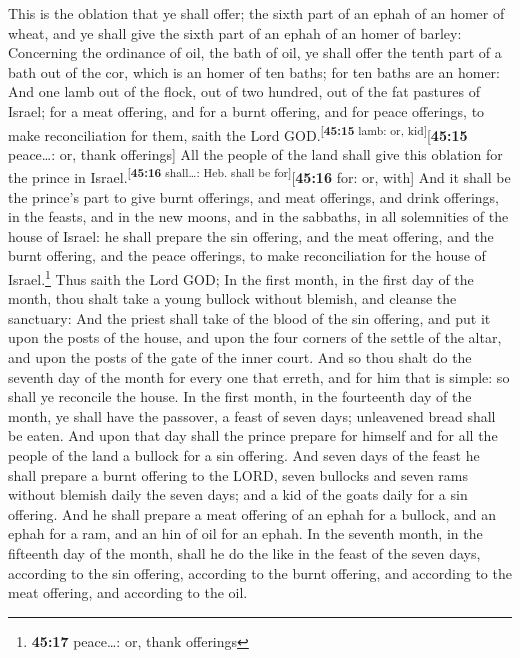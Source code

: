  This is the oblation that ye shall offer; the sixth part
of an ephah of an homer of wheat, and ye shall give the sixth part of an
ephah of an homer of barley:  Concerning the ordinance of
oil, the bath of oil, ye shall offer the tenth part of a bath out of the
cor, which is an homer of ten baths; for ten baths are an homer:
 And one lamb out of the flock, out of two hundred, out
of the fat pastures of Israel; for a meat offering, and for a burnt
offering, and for peace offerings, to make reconciliation for them,
saith the Lord GOD.\textsuperscript{{[}\textbf{45:15} lamb: or,
kid{]}}{[}\textbf{45:15} peace\ldots: or, thank offerings{]}
 All the people of the land shall give this oblation for
the prince in Israel.\textsuperscript{{[}\textbf{45:16} shall\ldots:
Heb. shall be for{]}}{[}\textbf{45:16} for: or, with{]} 
And it shall be the prince's part to give burnt offerings, and meat
offerings, and drink offerings, in the feasts, and in the new moons, and
in the sabbaths, in all solemnities of the house of Israel: he shall
prepare the sin offering, and the meat offering, and the burnt offering,
and the peace offerings, to make reconciliation for the house of
Israel.\footnote{\textbf{45:17} peace\ldots: or, thank offerings}
 Thus saith the Lord GOD; In the first month, in the
first day of the month, thou shalt take a young bullock without blemish,
and cleanse the sanctuary:  And the priest shall take of
the blood of the sin offering, and put it upon the posts of the house,
and upon the four corners of the settle of the altar, and upon the posts
of the gate of the inner court.  And so thou shalt do the
seventh day of the month for every one that erreth, and for him that is
simple: so shall ye reconcile the house.  In the first
month, in the fourteenth day of the month, ye shall have the passover, a
feast of seven days; unleavened bread shall be eaten. 
And upon that day shall the prince prepare for himself and for all the
people of the land a bullock for a sin offering.  And
seven days of the feast he shall prepare a burnt offering to the LORD,
seven bullocks and seven rams without blemish daily the seven days; and
a kid of the goats daily for a sin offering.  And he
shall prepare a meat offering of an ephah for a bullock, and an ephah
for a ram, and an hin of oil for an ephah.  In the
seventh month, in the fifteenth day of the month, shall he do the like
in the feast of the seven days, according to the sin offering, according
to the burnt offering, and according to the meat offering, and according
to the oil.

